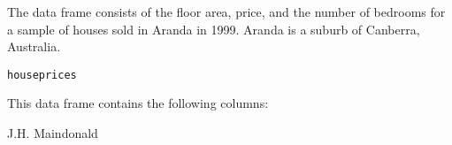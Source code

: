 \begin{Description}\relax
The  data frame consists of the floor
area, price, and the number
of bedrooms for a sample of houses sold in Aranda in 1999. 
Aranda is a suburb of Canberra, Australia.
\end{Description}
\begin{Usage}
\begin{verbatim}houseprices\end{verbatim}
\end{Usage}
\begin{Format}\relax
This data frame contains the following columns:
\end{Format}
\begin{Source}\relax
J.H. Maindonald
\end{Source}
